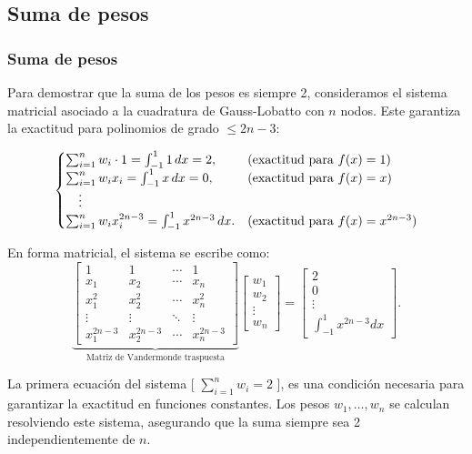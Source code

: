 \documentclass{beamer}
\begin{document}
\subsection{Suma de pesos}
\begin{frame}
\frametitle{Suma de pesos}
Para demostrar que la suma de los pesos es siempre 2, consideramos el sistema matricial asociado a la cuadratura de Gauss-Lobatto con \( n \) nodos. Este garantiza la exactitud para polinomios de grado \( \leq 2n-3 \):

\[
\begin{cases}
    \sum_{i=1}^n w_i \cdot 1 = \int_{-1}^1 1 \, dx = 2, & \text{(exactitud para \( f(x) = 1 \))} \\
    \sum_{i=1}^n w_i x_i = \int_{-1}^1 x \, dx = 0, & \text{(exactitud para \( f(x) = x \))} \\
    \quad \vdots & \\
    \sum_{i=1}^n w_i x_i^{2n-3} = \int_{-1}^1 x^{2n-3} \, dx. & \text{(exactitud para \( f(x) = x^{2n-3} \))}
\end{cases}
\]
\end{frame}


\begin{frame}
\noindent En forma matricial, el sistema se escribe como:
\[
\underbrace{
\begin{bmatrix}
1 & 1 & \cdots & 1 \\
x_1 & x_2 & \cdots & x_n \\
x_1^2 & x_2^2 & \cdots & x_n^2 \\
\vdots & \vdots & \ddots & \vdots \\
x_1^{2n-3} & x_2^{2n-3} & \cdots & x_n^{2n-3}
\end{bmatrix}
}_{\text{Matriz de Vandermonde traspuesta}}
\begin{bmatrix}
w_1 \\
w_2 \\
\vdots \\
w_n
\end{bmatrix}
=
\begin{bmatrix}
2 \\
0 \\
\vdots \\
\int_{-1}^1 x^{2n-3} dx
\end{bmatrix}.
\]

\noindent La primera ecuación del sistema [ $\sum_{i=1}^n w_i = 2$ ], es una condición necesaria para garantizar la exactitud en funciones constantes. Los pesos \( w_1, \ldots, w_n \) se calculan resolviendo este sistema, asegurando que la suma siempre sea 2 independientemente de \( n \).
\end{frame}
\end{document}
